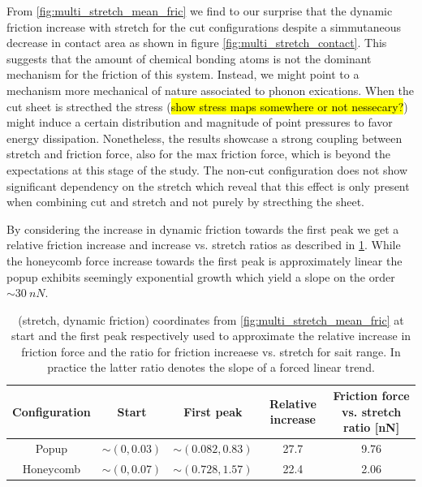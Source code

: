 From \cref{fig:multi_stretch_mean_fric} we find to our surprise that the
dynamic friction increase with stretch for the cut configurations despite a
simmutaneous decrease in contact area as shown in figure
\cref{fig:multi_stretch_contact}. This suggests that the amount of chemical
bonding atoms is not the dominant mechanism for the friction of this system.
Instead, we might point to a mechanism more mechanical of nature associated to
phonon exications. When the cut sheet is strecthed the stress (\hl{show stress
maps somewhere or not nessecary?}) might induce a certain distribution and
magnitude of point pressures to favor energy dissipation. Nonetheless, the
results showcase a strong coupling between stretch and friction force, also for
the max friction force, which is beyond the expectations at this stage of the
study. The non-cut configuration does not show significant dependency on the stretch which reveal that this effect is only present when combining cut and stretch and not purely by strecthing the sheet. 

By considering the increase in dynamic friction towards the first peak we get a relative friction increase and increase vs. stretch ratios as described in \cref{tab:first_peak_stretch}. While the honeycomb force increase towards the first peak is approximately linear the popup exhibits seemingly exponential growth which yield a slope on the order $\sim \SI{30}{nN}$. 

\begin{table}[H]
  \begin{center}
  \caption{(stretch, dynamic friction) coordinates from \cref{fig:multi_stretch_mean_fric} at start and the first peak respectively used to approximate the relative increase in friction force and the ratio for friction increaese vs. stretch for sait range. In practice  the latter ratio denotes the slope of a forced linear trend. }
  \label{tab:first_peak_stretch}
  \begin{tabular}{ | c | c | c | c | c |} \hline
  Configuration & Start & First peak & Relative increase & Friction force vs. stretch ratio [nN]  \\ \hline
  Popup & $\sim (0, 0.03)$ & $\sim(0.082, 0.83)$ & 27.7 & 9.76  \\ \hline
  Honeycomb & $\sim (0, 0.07)$ &  $\sim (0.728, 1.57)$ & 22.4 & 2.06 \\ \hline
  \end{tabular}
  \end{center}
\end{table}

